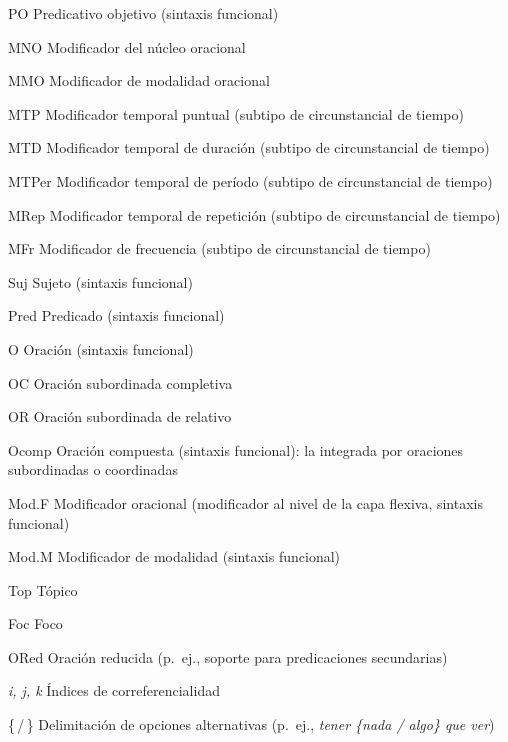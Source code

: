 \begin{siglario}
  \item[PO] Predicativo objetivo (sintaxis funcional)
  \item[MNO] Modificador del núcleo oracional
  \item[MMO] Modificador de modalidad oracional
  \item[MTP] Modificador temporal puntual (subtipo de circunstancial de tiempo)
  \item[MTD] Modificador temporal de duración (subtipo de circunstancial de
        tiempo)
  \item[MTPer] Modificador temporal de período (subtipo de circunstancial de
        tiempo)
  \item[MRep] Modificador temporal de repetición (subtipo de circunstancial de
        tiempo)
  \item[MFr] Modificador de frecuencia (subtipo de circunstancial de tiempo)
\end{siglario}

\begin{siglario}
  \item[Suj] Sujeto (sintaxis funcional)
  \item[Pred] Predicado (sintaxis funcional)
  \item[O] Oración (sintaxis funcional)
  \item[OC] Oración subordinada completiva
  \item[OR] Oración subordinada de relativo
  \item[Ocomp] Oración compuesta (sintaxis funcional): la integrada por
        oraciones subordinadas o coordinadas
  \item[Mod.F] Modificador oracional (modificador al nivel de la capa flexiva,
        sintaxis funcional)
  \item[Mod.M] Modificador de modalidad (sintaxis funcional)
\end{siglario}

\begin{siglario}
  \item[Top] Tópico
  \item[Foc] Foco
\end{siglario}

\begin{siglario}
  \item[ORed] Oración reducida (p.~ej., soporte para predicaciones secundarias)
  \item[\textit{i, j, k}] Índices de correferencialidad
  \item[\{\,/\,\}] Delimitación de opciones alternativas (p.~ej., \textit{tener
        \{nada / algo\} que ver})%
\end{siglario}
